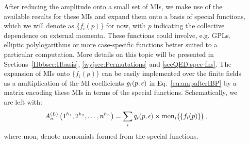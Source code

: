 \documentclass[main.tex]{subfiles}
\begin{document}
After reducing the amplitude onto a small set of MIs, we make use of the available results for these MIs and expand them onto a basis of special functions, which we will denote as $\{f_i(p)\}$ for now, with $p$ indicating the collective dependence on external momenta. These functions could involve, e.g. GPLs, elliptic polylogarithms or more case-specific functions better suited to a particular computation. More details on this topic will be presented in Sections~\ref{Hbbsec:Hbasis}, \ref{wyjsec:Permutations} and \ref{secQED:spec-fns}. The expansion of MIs onto $\{f_i(p)\}$ can be easily implemented over the finite fields as a multiplication of the MI coefficients $g_i(p, \epsilon)$ in Eq.~\ref{eq:ampafterIBP} by a matrix encoding these MIs in terms of the special functions. Schematically, we are left with:
\begin{equation} \label{eq:ampexpandedspfuncs}
    A_n^{(L)} \left(1^{h_1}, 2^{h_2}, \ldots, n^{h_n} \right) = \sum_i q_i(p, \epsilon) \times \text{mon}_i \big(\{f_i(p)\}\big)\,,
\end{equation}
where mon$_i$ denote monomials formed from the special functions.
\end{document}
